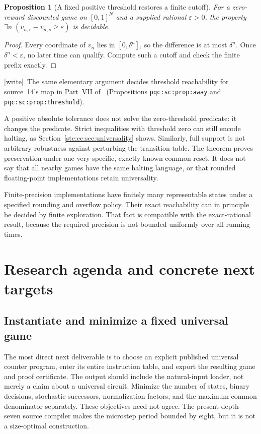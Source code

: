 \documentclass[11pt,letterpaper]{article}
\newtheorem{proposition}[theorem]{Proposition}
\theoremstyle{definition}
\theoremstyle{remark}
\newcommand{\wtag}{\textup{[write]}}
\begin{document}
\begin{proposition}[A fixed positive threshold restores a finite cutoff]\label{ste:ec:prop:threshold}
For a zero-reward discounted game on $[0,1]^N$ and a supplied rational
$\varepsilon>0$, the property
$\exists n\;(v_{n,r}-v_{n,s}\geq\varepsilon)$ is decidable.
\end{proposition}

\begin{proof}
Every coordinate of $v_n$ lies in $[0,\delta^n]$, so the difference is at
most $\delta^n$. Once $\delta^n<\varepsilon$, no later time can qualify.
Compute such a cutoff and check the finite prefix exactly.
\end{proof}

\wtag\ The same elementary argument decides threshold reachability for source~14's map in Part~VII of~\cite{pqc} (Propositions \texttt{pqc:sc:prop:away} and \texttt{pqc:sc:prop:threshold}).

A positive absolute tolerance does not solve the zero-threshold predicate:
it changes the predicate. Strict inequalities with threshold zero can
still encode halting, as Section~\ref{ste:ec:sec:universality} shows. Similarly,
full support is not arbitrary robustness against perturbing the transition
table. The theorem proves preservation under one very specific, exactly
known common reset. It does not say that all nearby games have the same
halting language, or that rounded floating-point implementations retain
universality.

Finite-precision implementations have finitely many representable states
under a specified rounding and overflow policy. Their exact reachability
can in principle be decided by finite exploration. That fact is compatible
with the exact-rational result, because the required precision is not
bounded uniformly over all running times.

\section{Research agenda and concrete next targets}
\label{ste:ec:sec:agenda}

\subsection{Instantiate and minimize a fixed universal game}\label{ste:ec:q:instantiate}

The most direct next deliverable is to choose an explicit published
universal counter program, enter its entire instruction table, and export
the resulting game and proof certificate. The output should include the
natural-input loader, not merely a claim about a universal circuit.
Minimize the number of states, binary decisions, stochastic successors,
normalization factors, and the maximum common denominator separately.
These objectives need not agree. The present depth-seven source compiler
makes the microstep period bounded by eight, but it is not a size-optimal
construction.
\end{document}
